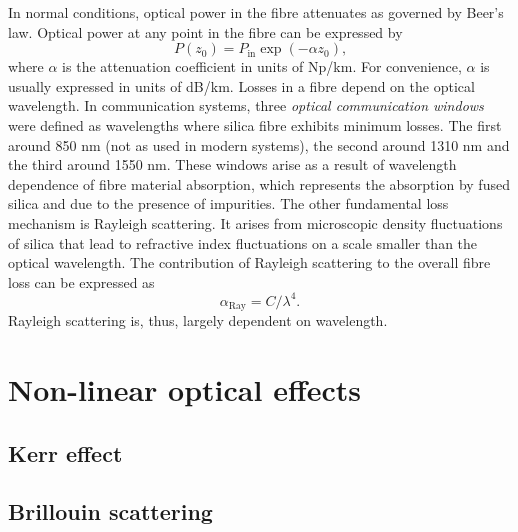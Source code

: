 \documentclass{standalone}
\begin{document}
In normal conditions, optical power in the fibre attenuates as governed by Beer's law. Optical power at any point in the fibre can be expressed by
\begin{equation}
P(z_0) = P_\textrm{in} \exp\left(-\alpha z_0\right) \textrm{,}
\end{equation}
where $\alpha$ is the attenuation coefficient in units of Np/km. For convenience, $\alpha$ is usually expressed in units of dB/km. Losses in a fibre depend on the optical wavelength. In communication systems, three \emph{optical communication windows} were defined as wavelengths where silica fibre exhibits minimum losses. The first around 850 nm (not as used in modern systems), the second around 1310 nm and the third around 1550 nm. These windows arise as a result of wavelength dependence of fibre material absorption, which represents the absorption by fused silica and due to the presence of impurities. The other fundamental loss mechanism is Rayleigh scattering. It arises from microscopic density fluctuations of silica that lead to refractive index fluctuations on a scale smaller than the optical wavelength. The contribution of Rayleigh scattering to the overall fibre loss can be expressed as
\begin{equation}
\alpha_\textrm{Ray} = C / \lambda^4 \textrm{.}
\end{equation}
Rayleigh scattering is, thus, largely dependent on wavelength. \\


\section{Non-linear optical effects}

\subsection{Kerr effect}

\subsection{Brillouin scattering}
\end{document}
